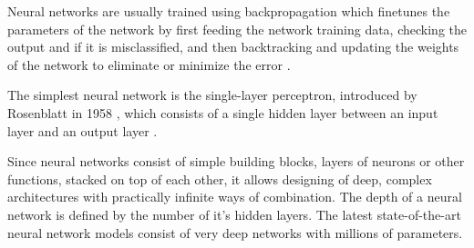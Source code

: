 Neural networks are usually trained using backpropagation which finetunes the parameters of the network by first feeding the network training data, checking the output and if it is misclassified, and then backtracking and updating the weights of the network to eliminate or minimize the error \cite{sebastiani2002}.

The simplest neural network is the single-layer perceptron, introduced by Rosenblatt in 1958 , which consists of a single hidden layer between an input layer and an output layer \cite{rosenblatt1958}.

Since neural networks consist of simple building blocks, layers of neurons or other functions, stacked on top of each other, it allows designing of deep, complex architectures with practically infinite ways of combination.
The depth of a neural network is defined by the number of it's hidden layers.
The latest state-of-the-art neural network models consist of very deep networks with millions of parameters.
